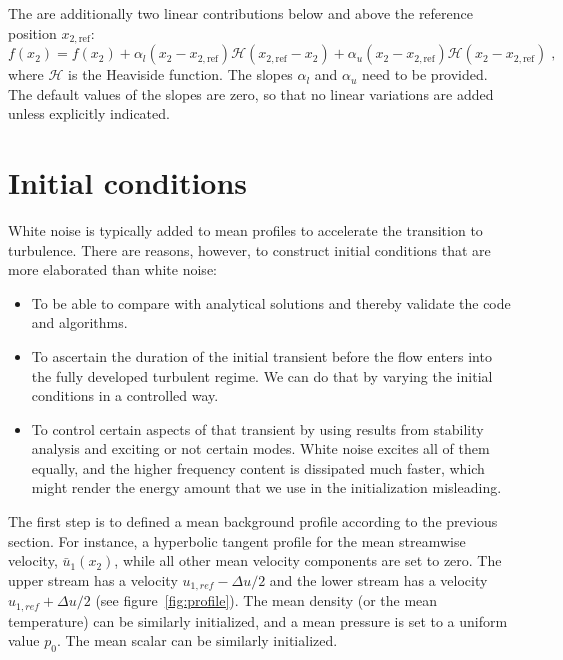 The are additionally two linear contributions below and above the reference position $x_{2,\text{ref}}$:
\begin{equation}
    f(x_2) = f(x_2)  +\alpha_l (x_2-x_{2,\text{ref}}) \mathcal{H}(x_{2,\text{ref}}-x_2)+\alpha_u (x_2-x_{2,\text{ref}}) \mathcal{H}(x_2-x_{2,\text{ref}})\;,
\end{equation}
where $\mathcal{H}$ is the Heaviside function. The slopes $\alpha_l$ and $\alpha_u$ need to be provided. The default values of the slopes are zero, so that no linear variations are added unless explicitly indicated.

\section{Initial conditions}

White noise is typically added to mean profiles to accelerate the transition to turbulence. There are reasons, however, to construct initial conditions that are more elaborated than white noise:
\begin{itemize}
    \item To be able to compare with analytical solutions and thereby validate the code and algorithms.
    \item To ascertain the duration of the initial transient before the flow enters into the fully developed turbulent regime. We can do that by varying the initial conditions in a controlled way.
    \item To control certain aspects of that transient by using results from stability analysis and exciting or not certain modes. White noise excites all of them equally, and the higher frequency content is dissipated much faster, which might render the energy amount that we use in the initialization misleading. %
\end{itemize}

The first step is to defined a mean background profile according to the previous section. For instance, a hyperbolic tangent profile for the mean streamwise velocity, $\bar{u}_1(x_2)$, while all other mean velocity components are set to zero.  The upper stream has a velocity $u_{1,ref}-\Delta u/2$ and the lower stream has a velocity $u_{1,ref}+\Delta u/2$ (see figure~\ref{fig:profile}). The mean density (or the mean temperature) can be similarly initialized, and a mean pressure is set to a uniform value $p_0$. The mean scalar can be similarly initialized.

